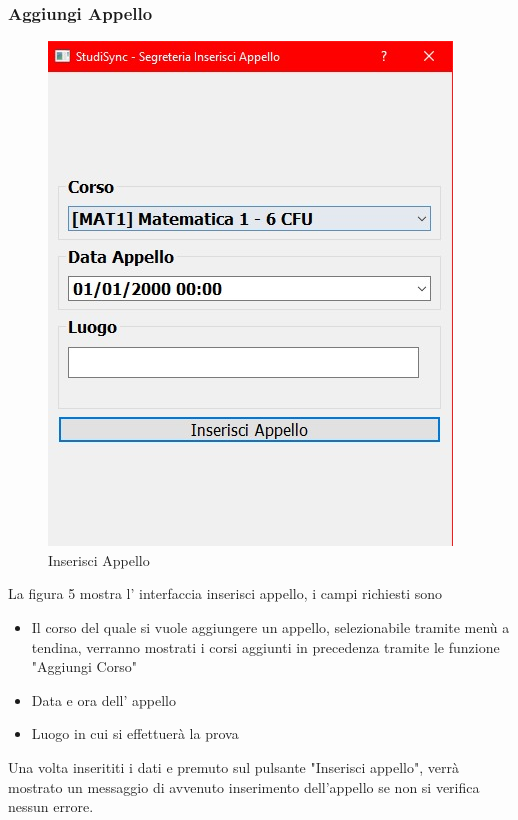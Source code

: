 \documentclass{article}
\begin{document}
\subsubsection{Aggiungi Appello}
\begin{figure}
    \centering
    \includegraphics[width=0.75\linewidth]{IMG/InserisciAppello.jpg}
    \caption{Inserisci Appello}
    \label{fig:enter-label}
\end{figure}

\newpage
La figura 5 mostra l' interfaccia inserisci appello, i campi richiesti sono
\begin{itemize}
    \item Il corso del quale si vuole aggiungere un appello, selezionabile tramite menù a tendina, verranno mostrati i corsi aggiunti in precedenza tramite le funzione "Aggiungi Corso"
    \item Data e ora dell' appello 
    \item Luogo in cui si effettuerà la prova
\end{itemize}

Una volta inserititi  i dati e premuto sul pulsante "Inserisci appello", verrà mostrato un messaggio di avvenuto inserimento dell'appello se non si verifica nessun errore.

\newpage
\end{document}
